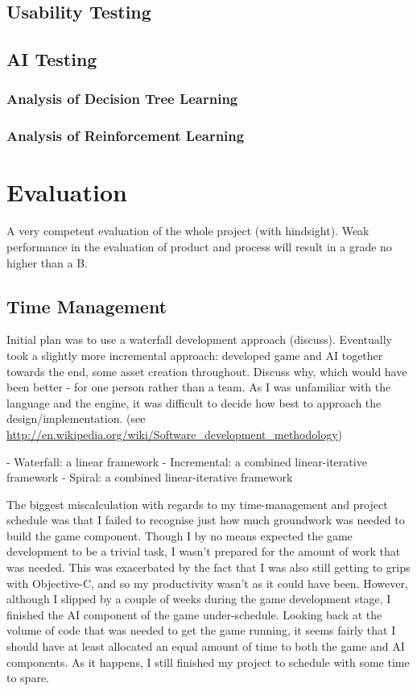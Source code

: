 \documentclass[a4paper,oneside]{report}
\begin{document}
\section{Usability Testing}

\section{AI Testing}

\subsection{Analysis of Decision Tree Learning}
\subsection{Analysis of Reinforcement Learning}



%
%

\chapter{Evaluation}

A very competent evaluation of the whole project (with hindsight). Weak performance in the evaluation of product and process will result in a grade no higher than a B.

\section{Time Management}

Initial plan was to use a waterfall development approach (discuss). Eventually took a slightly more incremental approach: developed game and AI together towards the end, some asset creation throughout. Discuss why, which would have been better - for one person rather than a team. As I was unfamiliar with the language and the engine, it was difficult to decide how best to approach the design/implementation. (see \url{http://en.wikipedia.org/wiki/Software_development_methodology})
		
- Waterfall: a linear framework
- Incremental: a combined linear-iterative framework
- Spiral: a combined linear-iterative framework
		
The biggest miscalculation with regards to my time-management and project schedule was that I failed to recognise just how much groundwork was needed to build the game component. Though I by no means expected the game development to be a trivial task, I wasn't prepared for the amount of work that was needed. This was exacerbated by the fact that I was also still getting to grips with Objective-C, and so my productivity wasn't as it could have been. However, although I slipped by a couple of weeks during the game development stage, I finished the AI component of the game under-schedule. Looking back at the volume of code that was needed to get the game running, it seems fairly that I should have at least allocated an equal amount of time to both the game and AI components. As it happens, I still finished my project to schedule with some time to spare.
\end{document}
